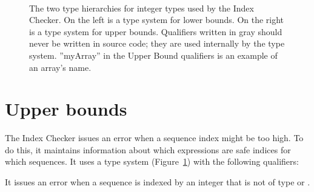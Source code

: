 \begin{figure}
\begin{center}
  \hfill
  ~~~~\hfill~~~~
  \hfill
\end{center}
  \caption{The two type hierarchies for integer types used by the Index
    Checker.  On the left is a type system for lower bounds.  On the right
    is a type system for upper bounds.  Qualifiers written in gray should
    never be written in source code; they are used internally by the type
    system. ''myArray'' in the Upper Bound qualifiers is an example of
    an array's name.}
  \label{fig-index-int-types}
\end{figure}


\section{Upper bounds\label{index-upperbound}}

The Index Checker issues an error when a sequence index might be
too high. To do this, it maintains information about which expressions are
safe indices for which sequences.
It uses a type system (Figure~\ref{fig-index-int-types}) with the following
qualifiers:

It issues an error when a sequence 
is indexed by an integer that is not of type 
or .

